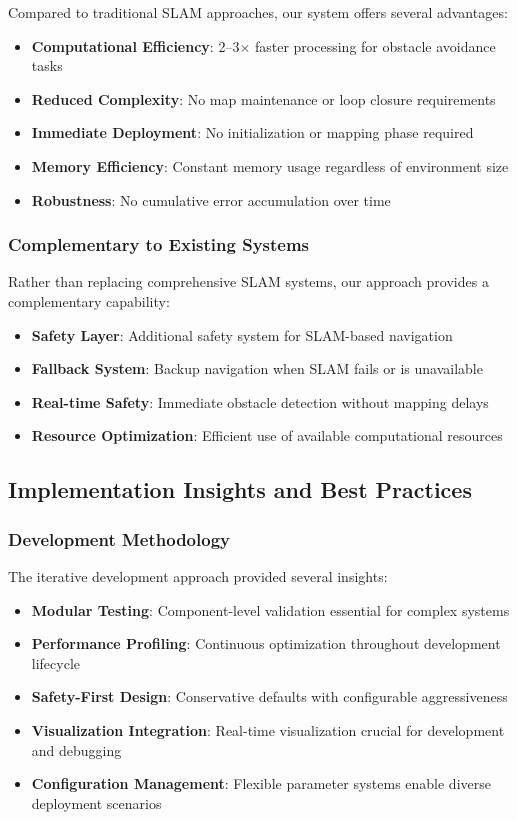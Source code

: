 \documentclass[10pt]{article}
\begin{document}
Compared to traditional SLAM approaches, our system offers several advantages:

\begin{itemize}
\item \textbf{Computational Efficiency}: 2--3$\times$ faster processing for obstacle avoidance tasks
\item \textbf{Reduced Complexity}: No map maintenance or loop closure requirements
\item \textbf{Immediate Deployment}: No initialization or mapping phase required
\item \textbf{Memory Efficiency}: Constant memory usage regardless of environment size
\item \textbf{Robustness}: No cumulative error accumulation over time
\end{itemize}

\subsubsection{Complementary to Existing Systems}

Rather than replacing comprehensive SLAM systems, our approach provides a complementary capability:

\begin{itemize}
\item \textbf{Safety Layer}: Additional safety system for SLAM-based navigation
\item \textbf{Fallback System}: Backup navigation when SLAM fails or is unavailable
\item \textbf{Real-time Safety}: Immediate obstacle detection without mapping delays
\item \textbf{Resource Optimization}: Efficient use of available computational resources
\end{itemize}

\subsection{Implementation Insights and Best Practices}

\subsubsection{Development Methodology}

The iterative development approach provided several insights:

\begin{itemize}
\item \textbf{Modular Testing}: Component-level validation essential for complex systems
\item \textbf{Performance Profiling}: Continuous optimization throughout development lifecycle
\item \textbf{Safety-First Design}: Conservative defaults with configurable aggressiveness
\item \textbf{Visualization Integration}: Real-time visualization crucial for development and debugging
\item \textbf{Configuration Management}: Flexible parameter systems enable diverse deployment scenarios
\end{itemize}
\end{document}
